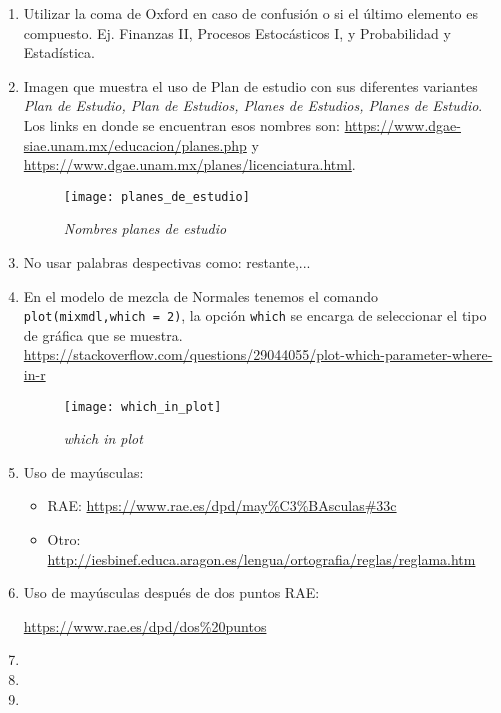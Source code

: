 \begin{appendices}
\begin{enumerate}
  \item Utilizar la coma de Oxford en caso de confusión o si el último elemento es compuesto. Ej. Finanzas II, Procesos Estocásticos I, y Probabilidad y Estadística.
  
  \item Imagen que muestra el uso de Plan de estudio con sus diferentes variantes \textit{Plan de Estudio, Plan de Estudios, Planes de Estudios, Planes de Estudio}. Los links en donde se encuentran esos nombres son: \url{https://www.dgae-siae.unam.mx/educacion/planes.php} y \url{https://www.dgae.unam.mx/planes/licenciatura.html}.

\begin{figure}[H]
\centering
\texttt{[image: planes\_de\_estudio]} %
\caption{\textit{Nombres planes de estudio}}
\end{figure}
  
  \item No usar palabras despectivas como: restante,...
  
  \item En el modelo de mezcla de Normales tenemos el comando \verb+plot(mixmdl,which = 2)+, la opción \verb+which+ se encarga de seleccionar el tipo de gráfica que se muestra. \url{https://stackoverflow.com/questions/29044055/plot-which-parameter-where-in-r}
  
\begin{figure}[H]
\centering
\texttt{[image: which\_in\_plot]} %
\caption{\textit{which in plot}}
\end{figure}
  
  \item Uso de mayúsculas:
  \begin{itemize}
  \item RAE: \url{https://www.rae.es/dpd/may\%C3\%BAsculas#33c}
  
  \item Otro: \url{http://iesbinef.educa.aragon.es/lengua/ortografia/reglas/reglama.htm}
  \end{itemize}
  
  \item Uso de mayúsculas después de dos puntos RAE:
  
  \url{https://www.rae.es/dpd/dos\%20puntos}
  
  \item 
  
  \item 
  
  \item 
  

\end{enumerate}
\end{appendices}
